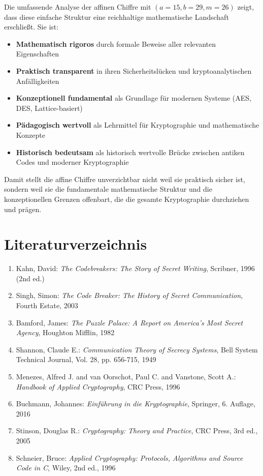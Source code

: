 ﻿\documentclass[12pt,a4paper]{article}
\begin{document}
	Die umfassende Analyse der affinen Chiffre mit $(a=15, b=29, m=26)$ zeigt, dass diese einfache Struktur eine reichhaltige mathematische Landschaft erschließt. Sie ist:
	
	\begin{itemize}
		\item \textbf{Mathematisch rigoros} durch formale Beweise aller relevanten Eigenschaften
		\item \textbf{Praktisch transparent} in ihren Sicherheitslücken und kryptoanalytischen Anfällig\-keiten
		\item \textbf{Konzeptionell fundamental} als Grundlage für modernen Systeme (AES, DES, Lattice-basiert)
		\item \textbf{Pädagogisch wertvoll} als Lehrmittel für Kryptographie und mathematische Konzepte
		\item \textbf{Historisch bedeutsam} als historisch wertvolle Brücke zwischen antiken Codes und moderner Kryptographie
	\end{itemize}
	
	Damit stellt die affine Chiffre unverzichtbar nicht weil sie praktisch sicher ist, sondern weil sie die fundamentale mathematische Struktur und die konzeptionellen Grenzen offenbart, die die gesamte Kryptographie durchziehen und prägen.
	
	
	\section*{Literaturverzeichnis}
	
	\begin{enumerate}
		\item Kahn, David: \textit{The Codebreakers: The Story of Secret Writing}, Scribner, 1996 (2nd ed.)
		\item Singh, Simon: \textit{The Code Breaker: The History of Secret Communication}, Fourth Estate, 2003
		\item Bamford, James: \textit{The Puzzle Palace: A Report on America's Most Secret Agency}, Houghton Mifflin, 1982
	\end{enumerate}
	
	\begin{enumerate}
		\setcounter{enumi}{3}
		\item Shannon, Claude E.: \textit{Communication Theory of Secrecy Systems}, Bell System Technical Journal, Vol. 28, pp. 656-715, 1949
		\item Menezes, Alfred J. and van Oorschot, Paul C. and Vanstone, Scott A.: \textit{Handbook of Applied Cryptography}, CRC Press, 1996
		\item Buchmann, Johannes: \textit{Einführung in die Kryptographie}, Springer, 6. Auflage, 2016
		\item Stinson, Douglas R.: \textit{Cryptography: Theory and Practice}, CRC Press, 3rd ed., 2005
		\item Schneier, Bruce: \textit{Applied Cryptography: Protocols, Algorithms and Source Code in C}, Wiley, 2nd ed., 1996
	\end{enumerate}
	
\end{document}
